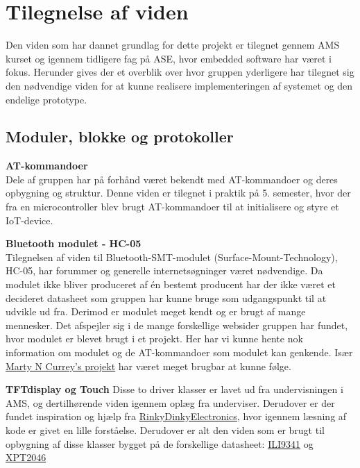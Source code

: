 \graphicspath{{Chapters/Alternative/}}


\section{Tilegnelse af viden}

Den viden som har dannet grundlag for dette projekt er tilegnet gennem AMS kurset og igennem tidligere fag på ASE, hvor embedded software har været i fokus. Herunder gives der et overblik over hvor gruppen yderligere har tilegnet sig den nødvendige viden for at kunne realisere implementeringen af systemet og den endelige prototype.

\subsection{Moduler, blokke og protokoller}
  
\textbf{AT-kommandoer} \\
Dele af gruppen har på forhånd været bekendt med AT-kommandoer og deres opbygning og struktur. Denne viden er tilegnet i praktik på 5. semester, hvor der fra en microcontroller blev brugt AT-kommandoer til at initialisere og styre et IoT-device.

\textbf{Bluetooth modulet - HC-05}\\
Tilegnelsen af viden til Bluetooth-SMT-modulet (Surface-Mount-Technology), HC-05, har forummer og generelle internetsøgninger været nødvendige. Da modulet ikke bliver produceret af én bestemt producent har der ikke været et decideret datasheet som gruppen har kunne bruge som udgangspunkt til at udvikle ud fra. Derimod er modulet meget kendt og er brugt af mange mennesker. Det afspejler sig i de mange forskellige websider gruppen har fundet, hvor modulet er blevet brugt i et projekt. Her har vi kunne hente nok information om modulet og de AT-kommandoer som modulet kan genkende.
Især \href{http://www.martyncurrey.com/arduino-with-hc-05-bluetooth-module-at-mode/}{Marty N Currey's projekt} har været meget brugbar at kunne følge.


\textbf{TFTdisplay og Touch}
Disse to driver klasser er lavet ud fra undervisningen i AMS, og dertilhørende viden igennem oplæg fra underviser. Derudover er der fundet inspiration og hjælp fra \href{http://www.rinkydinkelectronics.com/library.php}{RinkyDinkyElectronics}, hvor igennem læsning af kode er givet en lille forståelse. Derudover er alt den viden som er brugt til opbygning af disse klasser bygget på de forskellige datasheet: \href{https://blackboard.au.dk/bbcswebdav/pid-1697983-dt-content-rid-3847230_1/courses/BB-Cou-UUVA-73302/BB-Cou-UUVA-65758_ImportedContent_20170106021228/BB-Cou-STADS-UUVA-52360_ImportedContent_20160107025559/LAB/Lab3a%20Graphic%20LCD%20Display/Files%20for%20LAB3a/ILI9341_v1.11.pdf}{ILI9341} 
og 
\href{https://blackboard.au.dk/bbcswebdav/pid-1762166-dt-content-rid-4251461_1/courses/BB-Cou-UUVA-73302/BB-Cou-UUVA-65758_ImportedContent_20170106021228/BB-Cou-STADS-UUVA-52360_ImportedContent_20160107025559/LAB/LAB10%20Touch%20Screen%20Driver/Files%20for%20LAB10/XPT2046.pdf}{XPT2046}